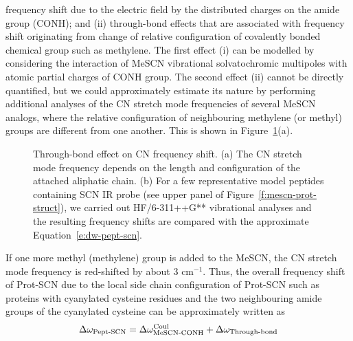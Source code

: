 \documentclass[b5paper,oneside,fleqn,11pt]{book}
\begin{document}
\begin{refsection}
frequency shift due to the electric field by the distributed
charges on the amide group (CONH); and (ii) through\hyp{}bond
effects that are associated with frequency shift originating
from change of relative configuration of covalently bonded
chemical group such as methylene. The first effect (i) can be
modelled by considering the interaction of MeSCN
vibrational solvatochromic multipoles with atomic partial
charges of CONH group. The second effect (ii) cannot be
directly quantified, but we could approximately estimate its
nature by performing additional analyses of the CN stretch
mode frequencies of several MeSCN analogs,
where the relative configuration of neighbouring methylene (or
methyl) groups are different from one another. 
This is shown in Figure~\ref{f:mescn-prot-through-bond}(a). 
%
\begin{figure}[t!]
\centering
\setlength\fboxsep{0.4pt}
\setlength\fboxrule{0.5pt}
\caption{
Through-bond effect on CN frequency shift. (a) The CN stretch mode frequency depends on the length and
configuration of the attached aliphatic chain. (b) For a few representative model peptides containing SCN IR
probe (see upper panel of Figure~\ref{f:mescn-prot-struct}), 
we carried out HF/6-311++G** vibrational analyses and the resulting frequency shifts are
compared with the approximate Equation~\ref{e:dw-pept-scn}.
\label{f:mescn-prot-through-bond}}
\end{figure}
%
If one more
methyl (methylene) group is added to the MeSCN, the CN
stretch mode frequency is red\hyp{}shifted by about 3 cm$^{-1}$. Thus,
the overall frequency shift of Prot-SCN due to the local side chain
configuration of Prot-SCN such as proteins with
cyanylated cysteine residues and the two neighbouring amide
groups of the cyanylated cysteine can be approximately
written as
%
\begin{equation} \label{e:dw-pept-scn}
 \Delta\omega_{\text{Pept-SCN}} = \Delta\omega_{\text{MeSCN-CONH}}^{\rm Coul} + \Delta\omega_{\text{Through-bond}}

\end{equation}
\end{refsection}
\end{document}
